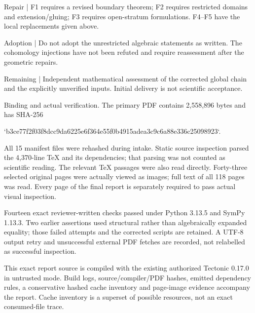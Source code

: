 \documentclass[10pt]{article}
\begin{document}
Repair | F1 requires a revised boundary theorem; F2 requires restricted domains and extension/gluing; F3 requires open-stratum formulations. F4–F5 have the local replacements given above.\par
Adoption | Do not adopt the unrestricted algebraic statements as written. The cohomology injections have not been refuted and require reassessment after the geometric repairs.\par
Remaining | Independent mathematical assessment of the corrected global chain and the explicitly unverified inputs. Initial delivery is not scientific acceptance.\par
Binding and actual verification. The primary PDF contains 2,558,896 bytes and has SHA-256\par
`b3ce77f2f03f8dcc9da6225e6f364e55f0b4915adea3c9c6a88e336c25098923`.\par
All 15 manifest files were rehashed during intake. Static source inspection parsed the 4,370-line TeX and its dependencies; that parsing was not counted as scientific reading. The relevant TeX passages were also read directly. Forty-three selected original pages were actually viewed as images; full text of all 118 pages was read. Every page of the final report is separately required to pass actual visual inspection.\par
Fourteen exact reviewer-written checks passed under Python 3.13.5 and SymPy 1.13.3. Two earlier assertions used structural rather than algebraically expanded equality; those failed attempts and the corrected scripts are retained. A UTF-8 output retry and unsuccessful external PDF fetches are recorded, not relabelled as successful inspection.\par
This exact report source is compiled with the existing authorized Tectonic 0.17.0 in untrusted mode. Build logs, source/compiler/PDF hashes, emitted dependency rules, a conservative hashed cache inventory and page-image evidence accompany the report. Cache inventory is a superset of possible resources, not an exact consumed-file trace.\par
\end{document}

